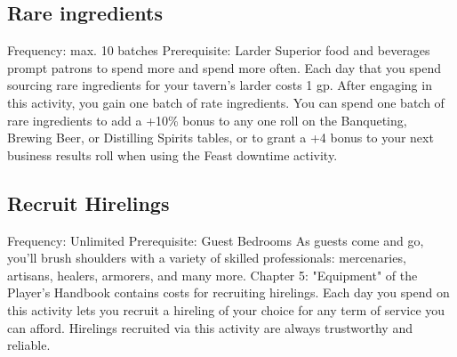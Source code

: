 \documentclass[10pt,a4paper,twoside,twocolumn,openany,bg=print,nodeprecatedcode]{dndbook}
\begin{document}
\subsection{Rare ingredients}
Frequency: max. 10 batches Prerequisite: Larder
Superior food and beverages prompt patrons to spend more and spend more often. Each day that you spend sourcing rare ingredients for your tavern's larder costs 1 gp. After engaging in this activity, you gain one batch of rate ingredients.
You can spend one batch of rare ingredients to add a +10\% bonus to any one roll on the Banqueting, Brewing Beer, or Distilling Spirits tables, or to grant a +4 bonus to your next business results roll when using the Feast downtime activity.
\subsection{Recruit Hirelings}
Frequency: Unlimited Prerequisite: Guest Bedrooms
As guests come and go, you'll brush shoulders with a variety of skilled professionals: mercenaries, artisans, healers, armorers, and many more. Chapter 5: "Equipment" of the Player's Handbook contains costs for recruiting hirelings. Each day you spend on this activity lets you recruit a hireling of your choice for any term of service you can afford. Hirelings recruited via this activity are always trustworthy and reliable.
\end{document}
